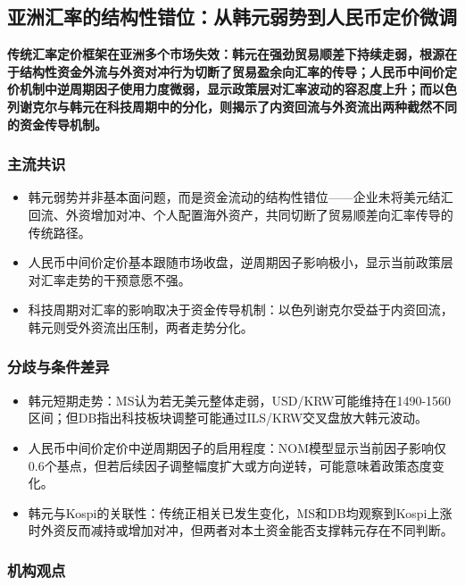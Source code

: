 \documentclass[11pt]{ctexart}
\begin{document}
\subsection{亚洲汇率的结构性错位：从韩元弱势到人民币定价微调}
\textbf{传统汇率定价框架在亚洲多个市场失效：韩元在强劲贸易顺差下持续走弱，根源在于结构性资金外流与外资对冲行为切断了贸易盈余向汇率的传导；人民币中间价定价机制中逆周期因子使用力度微弱，显示政策层对汇率波动的容忍度上升；而以色列谢克尔与韩元在科技周期中的分化，则揭示了内资回流与外资流出两种截然不同的资金传导机制。}
\subsubsection*{主流共识}
\begin{itemize}
  \item 韩元弱势并非基本面问题，而是资金流动的结构性错位——企业未将美元结汇回流、外资增加对冲、个人配置海外资产，共同切断了贸易顺差向汇率传导的传统路径。
  \item 人民币中间价定价基本跟随市场收盘，逆周期因子影响极小，显示当前政策层对汇率走势的干预意愿不强。
  \item 科技周期对汇率的影响取决于资金传导机制：以色列谢克尔受益于内资回流，韩元则受外资流出压制，两者走势分化。
\end{itemize}
\subsubsection*{分歧与条件差异}
\begin{itemize}
  \item 韩元短期走势：MS认为若无美元整体走弱，USD/KRW可能维持在1490-1560区间；但DB指出科技板块调整可能通过ILS/KRW交叉盘放大韩元波动。
  \item 人民币中间价定价中逆周期因子的启用程度：NOM模型显示当前因子影响仅0.6个基点，但若后续因子调整幅度扩大或方向逆转，可能意味着政策态度变化。
  \item 韩元与Kospi的关联性：传统正相关已发生变化，MS和DB均观察到Kospi上涨时外资反而减持或增加对冲，但两者对本土资金能否支撑韩元存在不同判断。
\end{itemize}
\subsubsection*{机构观点}
\end{document}
